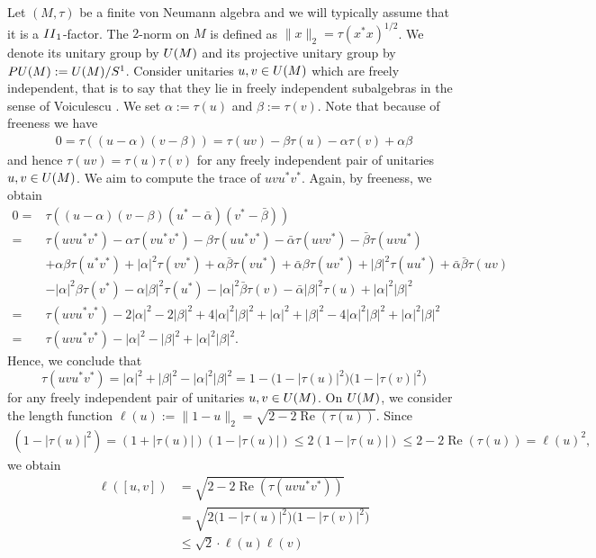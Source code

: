\documentclass[11pt]{article}
\numberwithin{equation}{section}
\numberwithin{equation}{section}
\begin{document}
Let $(M,\tau)$ be a finite von Neumann algebra and we will typically assume that it is a ${\rm II}_1$-factor. The $2$-norm on $M$ is defined as $\|x\|_2 = \tau(x^*x)^{1/2}$. We denote its unitary group by ${\rm U}(M)$ and its projective unitary group by ${\rm PU}(M):={\rm U}(M)/S^1$. Consider unitaries $u,v \in {\rm U}(M)$ which are freely independent, that is to say that they lie in freely independent subalgebras in the sense of Voiculescu \cite{MR1217253}. We set $\alpha := \tau(u)$ and $\beta := \tau(v)$. Note that because of freeness we have
\begin{gather*}
0 = \tau((u-\alpha)(v-\beta)) = \tau(uv) - \beta \tau(u) - \alpha \tau(v) + \alpha \beta
\end{gather*}
and hence $\tau(uv) = \tau(u)\tau(v)$ for any freely independent pair of unitaries $u,v \in {\rm U}(M)$. We aim to compute the trace of $uvu^*v^*$. Again, by freeness, we obtain
\begin{align*}
0 ={}& \tau((u-\alpha)(v-\beta)(u^* - \bar \alpha)(v^* - \bar \beta))
\\
={}& \tau(uvu^*v^*) - \alpha \tau(vu^*v^*) - \beta \tau(uu^*v^*) - \bar \alpha \tau(uvv^*) - \bar \beta \tau(uvu^*)
\\
& + \alpha \beta \tau(u^*v^*) + |\alpha|^2 \tau(vv^*) + \alpha \bar \beta \tau(vu^*) + \bar \alpha \beta \tau(uv^*) + |\beta|^2 \tau(uu^*) + \bar \alpha \bar \beta \tau(uv)
\\
& - |\alpha|^2 \beta \tau(v^*) - \alpha |\beta|^2 \tau(u^*) - |\alpha|^2 \bar \beta \tau(v) - \bar \alpha |\beta|^2 \tau(u) + |\alpha|^2|\beta|^2
\\
={}& \tau(uvu^*v^*) - 2|\alpha|^2 - 2 |\beta|^2 + 4 |\alpha|^2 |\beta|^2 + |\alpha|^2 + |\beta|^2 - 4 |\alpha|^2 |\beta|^2 + |\alpha|^2 |\beta|^2
\\
={}& \tau(uvu^*v^*) - |\alpha|^2 - |\beta|^2 + |\alpha|^2 |\beta|^2.
\end{align*}
Hence, we conclude that
\[
\tau(uvu^*v^*) = |\alpha|^2 + |\beta|^2 - |\alpha|^2 |\beta|^2 = 1 - \big(1-|\tau(u)|^2\big)\big(1-|\tau(v)|^2\big)
\] for any freely independent pair of unitaries $u,v \in {\rm U}(M)$.
On ${\rm U}(M)$, we consider the length function $\ell(u):= \|1-u\|_2 = \sqrt{2-2 \operatorname{Re}(\tau(u))}$.
Since
\begin{gather*}
(1-|\tau(u)|^2) = (1+ |\tau(u)|)(1-|\tau(u)|) \leq 2 (1-|\tau(u)|) \leq 2 - 2\operatorname{Re}(\tau(u)) = \ell(u)^2,
\end{gather*}
we obtain
\begin{align*}
\ell([u,v]) &= \sqrt{2-2 \operatorname{Re}(\tau(uvu^*v^*))} \\
&= \sqrt{2\big(1-|\tau(u)|^2\big)\big(1- |\tau(v)|^2\big)} \\
&\leq\sqrt{2} \cdot \ell(u) \ell(v)
\end{align*}
\end{document}
